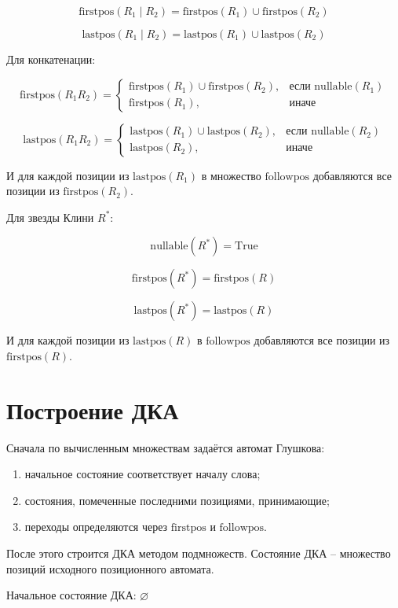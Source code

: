 \documentclass[a4paper,12pt]{article}
\begin{document}
\[
\text{firstpos}(R_1 \mid R_2) = \text{firstpos}(R_1) \cup \text{firstpos}(R_2)
\]

\[
\text{lastpos}(R_1 \mid R_2) = \text{lastpos}(R_1) \cup \text{lastpos}(R_2)
\]

Для конкатенации:

\[
\text{firstpos}(R_1R_2) =
\begin{cases}
\text{firstpos}(R_1) \cup \text{firstpos}(R_2), & \text{если } \text{nullable}(R_1) \\
\text{firstpos}(R_1), & \text{иначе}
\end{cases}
\]

\[
\text{lastpos}(R_1R_2) =
\begin{cases}
\text{lastpos}(R_1) \cup \text{lastpos}(R_2), & \text{если } \text{nullable}(R_2) \\
\text{lastpos}(R_2), & \text{иначе}
\end{cases}
\]

И для каждой позиции из $\text{lastpos}(R_1)$ в множество $\text{followpos}$ добавляются все позиции из $\text{firstpos}(R_2)$.

Для звезды Клини $R^*$:

\[
\text{nullable}(R^*) = \text{True}
\]

\[
\text{firstpos}(R^*) = \text{firstpos}(R)
\]

\[
\text{lastpos}(R^*) = \text{lastpos}(R)
\]

И для каждой позиции из $\text{lastpos}(R)$ в $\text{followpos}$ добавляются все позиции из $\text{firstpos}(R)$.

\section*{Построение ДКА}

Сначала по вычисленным множествам задаётся автомат Глушкова:

\begin{enumerate}
    \item начальное состояние соответствует началу слова;
    \item состояния, помеченные последними позициями, принимающие;
    \item переходы определяются через $\text{firstpos}$ и $\text{followpos}$.
\end{enumerate}

После этого строится ДКА методом подмножеств.
Состояние ДКА -- множество позиций исходного позиционного автомата.

Начальное состояние ДКА: $\varnothing$
\end{document}
